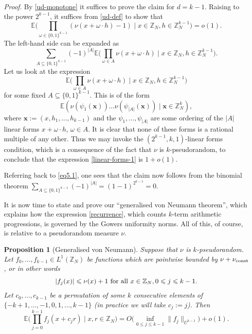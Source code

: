 \documentclass[12pt,a4paper,reqno]{amsart}
\numberwithin{equation}{section}
\theoremstyle{plain}
\newtheorem{proposition}[subsection]{Proposition}
\theoremstyle{definition}
\renewcommand{\leq}{\leqslant}
\def\vconstlem{\ensuremath \nu_{\mbox{\scriptsize \textup{const}}}}
\def\Z{{\mathbb Z}}
\def\E{{\mathbb E}}
\def\vs{\vspace{11pt}}
\def\ni{\noindent}
\def\proof{\noindent\textit{Proof. }}
\def\endproof{\hfill{\usebox{\proofbox}}}
\begin{document}
\proof 
By \eqref{ud-monotone} it suffices to prove the claim for $d=k-1$.  Raising to the power $2^{k-1}$, it suffices
from \eqref{ud-def} to show that
\[ \E\bigg( \prod_{\omega \in \{0,1\}^{k-1}} (\nu(x + \omega \cdot h)-1) \;
\bigg| \; x \in \mathbb{Z}_N, h \in \mathbb{Z}_N^{k-1}\bigg) = o(1).\]
The left-hand side can be expanded as
\begin{equation}\label{eq5.1} \sum_{A \subseteq \{0,1\}^{k-1}} (-1)^{|A|}
\E\bigg( \prod_{\omega \in A} \nu(x + \omega \cdot h) \; \bigg| \; x \in \mathbb{Z}_N, h \in \mathbb{Z}_N^{k-1} \bigg).\end{equation}
Let us look at the expression
\begin{equation}\label{linear-forms-1}
 \E\bigg( \prod_{\omega \in A} \nu(x + \omega \cdot h) \; \bigg| \; x \in \mathbb{Z}_N, h \in \mathbb{Z}_N^{k-1} \bigg)
\end{equation}
for some fixed $A \subseteq \{0,1\}^{k-1}$.
This is of the form
\[ \E\left(\nu(\psi_1(\mathbf{x}))\dots \nu(\psi_{|A|}(\mathbf{x})) \; |\; \mathbf{x} \in \mathbb{Z}_N^k\right),\]
where $\mathbf{x} := (x,h_1,\dots,h_{k-1})$ and the $\psi_1, \ldots, \psi_{|A|}$ are some ordering of the $|A|$ linear forms $x + \omega \cdot h$, $\omega \in A$. It is clear that none of these forms is a rational multiple of any other. Thus we may invoke the $(2^{k-1},k,1)$-linear forms condition, which is a consequence of the fact that $\nu$ is $k$-pseudorandom, to conclude that the expression \eqref{linear-forms-1} is $1 + o(1)$.\vs

\ni Referring back to \eqref{eq5.1}, one sees that the claim now follows from the binomial theorem $\sum_{A \subseteq \{0,1\}^{k-1}} (-1)^{|A|} = (1-1)^{2^{k-1}} = 0$.
\endproof\vspace{11pt}

\ni It is now time to state and prove our ``generalised von Neumann theorem'', which explains how the expression \eqref{recurrence}, which counts $k$-term arithmetic progressions, is governed by the Gowers uniformity norms. All of this, of course, is relative to a pseudorandom measure $\nu$.

\begin{proposition}[Generalised von Neumann]\label{vn} Suppose that $\nu$ is $k$-pseudorandom. Let $f_0, \ldots, f_{k-1} \in L^1(\Z_N)$ be functions which
are pointwise bounded by $\nu+\vconstlem$, or in other words
\begin{equation}\label{fj-bounds}
 |f_j(x)| \leq \nu(x) + 1 \hbox{ for all } x \in \mathbb{Z}_N, 0 \leq j \leq k-1.
\end{equation}
Let $c_0, \ldots, c_{k-1}$ be a permutation of some $k$ consecutive elements of $\{-k+1,\dots,-1,0,1,\ldots,k-1\}$ \textup{(}in practice we will take $c_j := j$\textup{)}. Then 
\[ \E\bigg( \prod_{j=0}^{k-1} f_j(x + c_j r) \;  \bigg| \; x,r \in \mathbb{Z}_N \bigg) = O\big(\inf_{0 \leq j \leq k-1} \| f_j \|_{U^{k-1}}\big) + o(1).\]
\end{proposition}
\end{document}
